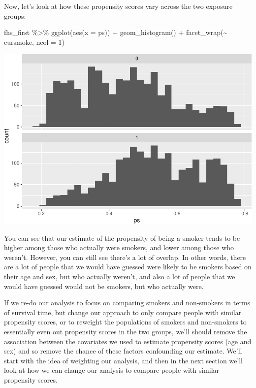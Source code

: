 \documentclass[
]{book}
\newenvironment{Shaded}{\begin{snugshade}}{\end{snugshade}}
\newcommand{\AttributeTok}[1]{\textcolor[rgb]{0.77,0.63,0.00}{#1}}
\newcommand{\DecValTok}[1]{\textcolor[rgb]{0.00,0.00,0.81}{#1}}
\newcommand{\FunctionTok}[1]{\textcolor[rgb]{0.00,0.00,0.00}{#1}}
\newcommand{\NormalTok}[1]{#1}
\newcommand{\SpecialCharTok}[1]{\textcolor[rgb]{0.00,0.00,0.00}{#1}}
\begin{document}
Now, let's look at how these propensity scores vary across the two exposure groups:

\begin{Shaded}
\begin{Highlighting}[]
\NormalTok{fhs\_first }\SpecialCharTok{\%\textgreater{}\%} 
  \FunctionTok{ggplot}\NormalTok{(}\FunctionTok{aes}\NormalTok{(}\AttributeTok{x =}\NormalTok{ ps)) }\SpecialCharTok{+} 
  \FunctionTok{geom\_histogram}\NormalTok{() }\SpecialCharTok{+} 
  \FunctionTok{facet\_wrap}\NormalTok{(}\SpecialCharTok{\textasciitilde{}}\NormalTok{ cursmoke, }\AttributeTok{ncol =} \DecValTok{1}\NormalTok{)}
\end{Highlighting}
\end{Shaded}

\includegraphics{adv_epi_analysis_files/figure-latex/unnamed-chunk-258-1.pdf}

You can see that our estimate of the propensity of being a smoker tends to be higher among those who actually were smokers, and lower among those who weren't. However, you can still see there's a lot of overlap. In other words, there are a lot of people that we would have guessed were likely to be smokers based on their age and sex, but who actually weren't, and also a lot of people that we would have guessed would not be smokers, but who actually were.

If we re-do our analysis to focus on comparing smokers and non-smokers in terms of survival time, but change our approach to only compare people with similar propensity scores, or to reweight the populations of smokers and non-smokers to essentially even out propensity scores in the two groups, we'll should remove the association between the covariates we used to estimate propensity scores (age and sex) and so remove the chance of these factors confounding our estimate. We'll start with the idea of weighting our analysis, and then in the next section we'll look at how we can change our analysis to compare people with similar propensity scores.
\end{document}

